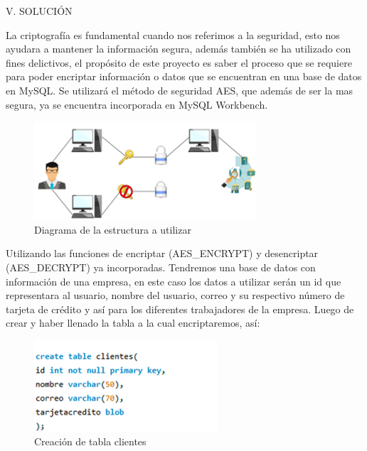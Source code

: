 \documentclass[9pt,24pt,twocolumn]{article}
\begin{document}
\begin{center}
{V.  SOLUCIÓN}
\end{center}

{La criptografía es fundamental cuando nos referimos a la seguridad, esto nos ayudara a mantener la información segura, además también se ha utilizado con fines delictivos, el propósito de este proyecto es saber el proceso que se requiere para poder encriptar información o datos que se encuentran en una base de datos en MySQL. Se utilizará el método de seguridad AES, que además de ser la mas segura, ya se encuentra incorporada en MySQL Workbench.}

\begin{figure}[h]
\begin{flushleft}
    \includegraphics{bas9}
\end{flushleft}
{\tiny \caption{Diagrama de la estructura a utilizar}}
  \label{fig:10}
\end{figure}

{Utilizando las funciones de encriptar (AES\_ENCRYPT) y desencriptar (AES\_DECRYPT) ya incorporadas.  Tendremos una base de datos con información de una empresa, en este caso los datos a utilizar serán un id que representara al usuario, nombre del usuario, correo y su respectivo número de tarjeta de crédito y así para los diferentes trabajadores de la empresa. Luego de crear y haber llenado la tabla a la cual encriptaremos, así:}

\begin{figure}[h]
\begin{flushleft}
    \includegraphics{bas1}
\end{flushleft}
{\tiny \caption{Creación de tabla clientes}}
  \label{fig:1}
\end{figure}
\end{document}
